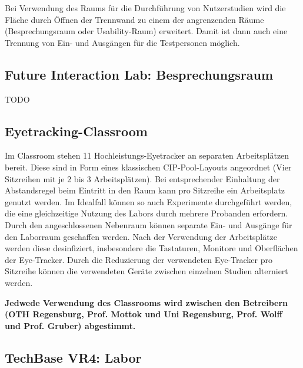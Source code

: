 \medskip
\noindent
Bei Verwendung des Raums für die Durchführung von Nutzerstudien wird die Fläche  durch Öffnen der Trennwand zu einem der angrenzenden Räume (Besprechungsraum oder Usability-Raum) erweitert.
Damit ist dann auch eine Trennung von Ein- und Ausgängen für die Testpersonen möglich.

\subsection{Future Interaction Lab: Besprechungsraum}


TODO

\subsection{Eyetracking-Classroom}


\noindent
Im Classroom stehen 11 Hochleistungs-Eyetracker an separaten Arbeitsplätzen bereit.
Diese sind in Form eines klassischen CIP-Pool-Layouts angeordnet (Vier Sitzreihen mit je 2 bis 3 Arbeitsplätzen).
Bei entsprechender Einhaltung der Abstandsregel beim Eintritt in den Raum kann pro Sitzreihe ein Arbeitsplatz genutzt werden.
Im Idealfall können so auch Experimente durchgeführt werden, die eine gleichzeitige Nutzung des Labors durch mehrere Probanden erfordern.
Durch den angeschlossenen Nebenraum können separate Ein- und Ausgänge für den Laborraum geschaffen werden.
Nach der Verwendung der Arbeitsplätze werden diese desinfiziert, insbesondere die Tastaturen, Monitore und Oberflächen der Eye-Tracker.
Durch die Reduzierung der verwendeten Eye-Tracker pro Sitzreihe können die verwendeten Geräte zwischen einzelnen Studien alterniert werden.

\medskip

\noindent
\textbf{Jedwede Verwendung des Classrooms wird zwischen den Betreibern (OTH Regensburg, Prof. Mottok und Uni Regensburg, Prof. Wolff und Prof. Gruber) abgestimmt.}

\subsection{TechBase VR4: Labor}

